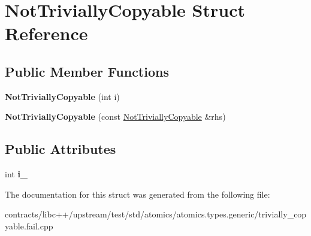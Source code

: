 \hypertarget{struct_not_trivially_copyable}{}\section{Not\+Trivially\+Copyable Struct Reference}
\label{struct_not_trivially_copyable}
\subsection*{Public Member Functions}
\begin{DoxyCompactItemize}
\item 
\mbox{\label{struct_not_trivially_copyable_a8441fb9f4151224c843e2fa1b34965e2}} 
{\bfseries Not\+Trivially\+Copyable} (int i)
\item 
\mbox{\label{struct_not_trivially_copyable_ae13d352db42e976cbbdad33487393b7b}} 
{\bfseries Not\+Trivially\+Copyable} (const \mbox{\hyperlink{struct_not_trivially_copyable}{Not\+Trivially\+Copyable}} \&rhs)
\end{DoxyCompactItemize}
\subsection*{Public Attributes}
\begin{DoxyCompactItemize}
\item 
\mbox{\label{struct_not_trivially_copyable_a505ac8cf73d3aeeccf3465d97d3f5150}} 
int {\bfseries i\+\_\+}
\end{DoxyCompactItemize}


The documentation for this struct was generated from the following file\+:\begin{DoxyCompactItemize}
\item 
contracts/libc++/upstream/test/std/atomics/atomics.\+types.\+generic/trivially\+\_\+copyable.\+fail.\+cpp\end{DoxyCompactItemize}
